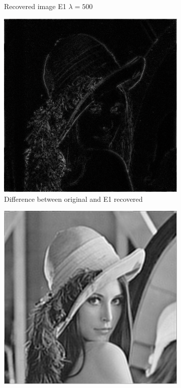 \documentclass[a4paper, 10pt, conference] {article}
\begin{document}
\begin{figure}[H]
\begin{subfigure}{0.49\textwidth}
		\caption{Recovered image E1 $\lambda = 500$}
	\end{subfigure}
	\begin{subfigure}{0.49\textwidth} 
		\centering						
		\includegraphics[scale=0.45]{comparison/difference1.PNG}
		\caption{Difference between original and E1 recovered}
	\end{subfigure}
	\begin{subfigure}{0.49\textwidth} 
		\centering						
		\includegraphics[scale=0.45]{comparison/energy2.PNG}

\end{subfigure}
\end{figure}
\end{document}
